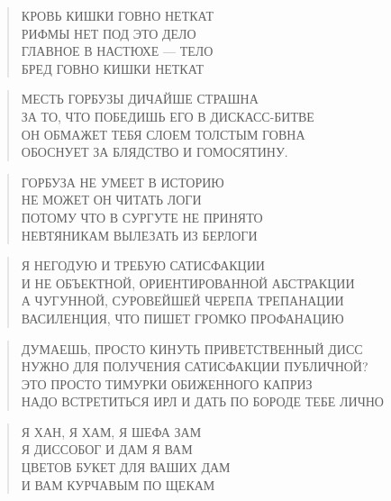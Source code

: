 \poemtitle{***}
\begin{verse}
КРОВЬ КИШКИ ГОВНО НЕТКАТ\\
РИФМЫ НЕТ ПОД ЭТО ДЕЛО\\
ГЛАВНОЕ В НАСТЮХЕ — ТЕЛО\\
БРЕД ГОВНО КИШКИ НЕТКАТ
\end{verse}

\poemtitle{***}
\begin{verse}
МЕСТЬ ГОРБУЗЫ ДИЧАЙШЕ СТРАШНА\\
ЗА ТО, ЧТО ПОБЕДИШЬ ЕГО В ДИСКАСС-БИТВЕ\\
ОН ОБМАЖЕТ ТЕБЯ СЛОЕМ ТОЛСТЫМ ГОВНА\\
ОБОСНУЕТ ЗА БЛЯДСТВО И ГОМОСЯТИНУ.
\end{verse}

\poemtitle{***}
\begin{verse}
ГОРБУЗА НЕ УМЕЕТ В ИСТОРИЮ\\
НЕ МОЖЕТ ОН ЧИТАТЬ ЛОГИ\\
ПОТОМУ ЧТО В СУРГУТЕ НЕ ПРИНЯТО\\
НЕВТЯНИКАМ ВЫЛЕЗАТЬ ИЗ БЕРЛОГИ
\end{verse}

\poemtitle{***}
\begin{verse}
Я НЕГОДУЮ И ТРЕБУЮ САТИСФАКЦИИ\\
И НЕ ОБЪЕКТНОЙ, ОРИЕНТИРОВАННОЙ АБСТРАКЦИИ\\
А ЧУГУННОЙ, СУРОВЕЙШЕЙ ЧЕРЕПА ТРЕПАНАЦИИ\\
ВАСИЛЕНЦИЯ, ЧТО ПИШЕТ ГРОМКО ПРОФАНАЦИЮ
\end{verse}

\poemtitle{***}
\begin{verse}
ДУМАЕШЬ, ПРОСТО КИНУТЬ ПРИВЕТСТВЕННЫЙ ДИСС\\
НУЖНО ДЛЯ ПОЛУЧЕНИЯ САТИСФАКЦИИ ПУБЛИЧНОЙ?\\
ЭТО ПРОСТО ТИМУРКИ ОБИЖЕННОГО КАПРИЗ\\
НАДО ВСТРЕТИТЬСЯ ИРЛ И ДАТЬ ПО БОРОДЕ ТЕБЕ ЛИЧНО
\end{verse}

\poemtitle{***}
\begin{verse}
Я ХАН, Я ХАМ, Я ШЕФА ЗАМ\\
Я ДИССОБОГ И ДАМ Я ВАМ\\
ЦВЕТОВ БУКЕТ ДЛЯ ВАШИХ ДАМ\\
И ВАМ КУРЧАВЫМ ПО ЩЕКАМ
\end{verse}

